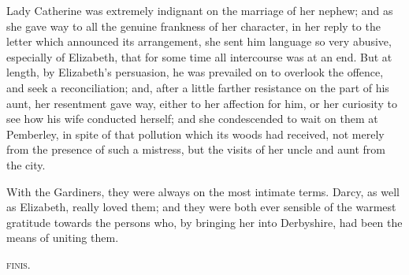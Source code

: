 Lady Catherine was extremely indignant on the marriage
of her nephew; and as she gave way to all the genuine
frankness of her character, in her reply to the letter which
announced its arrangement, she sent him language so very
abusive, especially of Elizabeth, that for some time all
intercourse was at an end. But at length, by Elizabeth’s
persuasion, he was prevailed on to overlook the offence,
and seek a reconciliation; and, after a little farther
resistance on the part of his aunt, her resentment gave
way, either to her affection for him, or her curiosity to see
how his wife conducted herself; and she condescended
to wait on them at Pemberley, in spite of that pollution
which its woods had received, not merely from the presence
of such a mistress, but the visits of her uncle and aunt
from the city.

With the Gardiners, they were always on the most
intimate terms. Darcy, as well as Elizabeth, really loved
them; and they were both ever sensible of the warmest
gratitude towards the persons who, by bringing her into
Derbyshire, had been the means of uniting them.

\strut

\begin{center}
\textsc{finis.}
\end{center}
